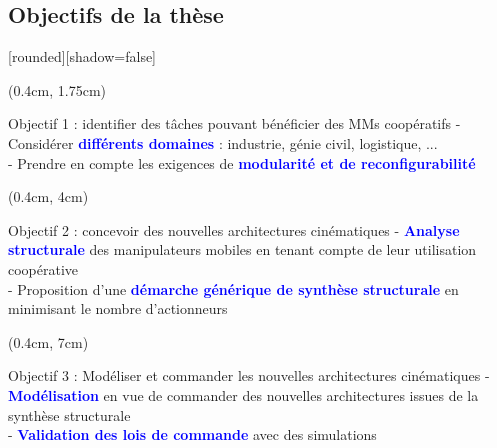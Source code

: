 \documentclass[french]{beamer}
\begin{document}
\subsection{Objectifs de la thèse}
\begin{frame}
[rounded][shadow=false]
{\small %
\begin{textblock*}{12cm}(0.4cm, 1.75cm)
\begin{block}{Objectif 1 : identifier des tâches pouvant bénéficier des MMs coopératifs}
- Considérer \textcolor{blue}{\textbf{différents domaines}} : industrie, génie civil, logistique, ...\\
- Prendre en compte les exigences de \textcolor{blue}{\textbf{modularité et de reconfigurabilité}}
\end{block}
\end{textblock*}

\begin{textblock*}{12cm}(0.4cm, 4cm)
\begin{block}{Objectif 2 : concevoir des nouvelles architectures cinématiques}
\justifying
- \textcolor{blue}{\textbf{Analyse structurale}} des manipulateurs mobiles en tenant compte de leur utilisation coopérative\\
- Proposition d'une \textcolor{blue}{\textbf{démarche générique de synthèse structurale}} en minimisant le nombre d'actionneurs
\end{block}
\end{textblock*}

\begin{textblock*}{12cm}(0.4cm, 7cm)
\begin{block}{Objectif 3 : Modéliser et commander les nouvelles architectures cinématiques}
\justifying
- \textcolor{blue}{\textbf{Modélisation}} en vue de commander des nouvelles architectures issues de la synthèse structurale\\
- \textcolor{blue}{\textbf{Validation des lois de commande}} avec des simulations
\end{block}
\end{textblock*}
}
\end{frame}

\end{document}
